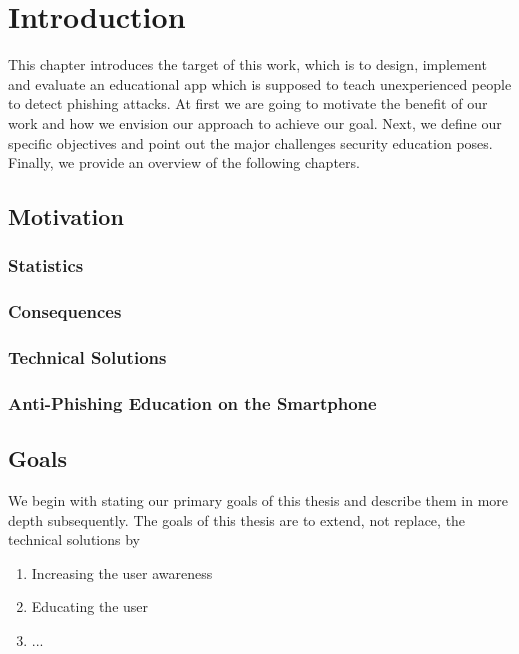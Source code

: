 \section{Introduction}
\label{s:introduction}
This chapter introduces the target of this work, which is to design, implement and evaluate an educational app which is supposed to teach unexperienced people to detect phishing attacks. At first we are going to motivate the benefit of our work and how we envision our approach to achieve our goal. Next, we define our specific objectives and point out the major challenges security education poses. Finally, we provide an overview of the following chapters.



\subsection{Motivation}

\subsubsection{Statistics}

\subsubsection{Consequences}

\subsubsection{Technical Solutions}

\subsubsection{Anti-Phishing Education on the Smartphone}

\subsection{Goals}
\label{s:goals}
We begin with stating our primary goals of this thesis and describe them in more depth subsequently. The goals of this thesis are to extend, not replace, the technical solutions by
\begin{enumerate}
	\item Increasing the user awareness
	\item Educating the user
	\item ...
\end{enumerate}

